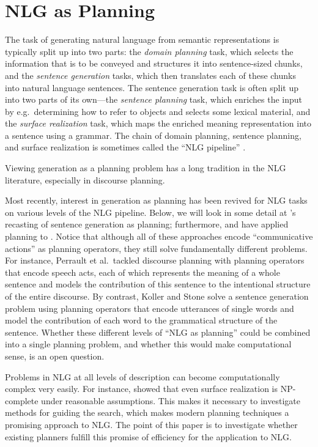 
\section{NLG as Planning} \label{sec:nlg-as-planning}

The task of generating natural language from semantic representations
is typically split up into two parts: the \emph{domain planning} task,
which selects the information that is to be conveyed and structures it
into sentence-sized chunks, and the \emph{sentence generation} tasks,
which then translates each of these chunks into natural language
sentences. The sentence generation task is often split up into two
parts of its own---the \emph{sentence planning} task, which enriches
the input by e.g.\ determining how to refer to objects and selects
some lexical material, and the \emph{surface realization} task, which
maps the enriched meaning representation into a sentence using a
grammar. The chain of domain planning, sentence planning, and surface
realization is sometimes called the ``NLG pipeline''
\cite{reiter00building}. 

Viewing generation as a planning problem has a long tradition in the
NLG literature, especially in discourse planning. 

Most recently, interest in generation as planning has been revived for
NLG tasks on various levels of the NLG pipeline. Below, we will look
in some detail at \cite{KolSto07}'s recasting of sentence generation
as planning; furthermore, \cite{Steedman-Petrick:07} and
\cite{benotti08b} have applied planning to . Notice
that although all of these approaches encode ``communicative actions''
as planning operators, they still solve fundamentally different
problems. For instance, Perrault et al.\ tackled discourse planning
with planning operators that encode speech acts, each of which
represents the meaning of a whole sentence and models the contribution
of this sentence to the intentional structure of the entire
discourse. By contrast, Koller and Stone solve a sentence generation
problem using planning operators that encode utterances of single
words and model the contribution of each word to the grammatical
structure of the sentence. Whether these different levels of ``NLG as
planning'' could be combined into a single planning problem, and
whether this would make computational sense, is an open question.

Problems in NLG at all levels of description can become
computationally complex very easily. For instance, \citet{KolStr02}
showed that even surface realization is NP-complete under reasonable
assumptions. This makes it necessary to investigate methods for
guiding the search, which makes modern planning techniques a promising
approach to NLG. The point of this paper is to investigate whether
existing planners fulfill this promise of efficiency for the
application to NLG.


